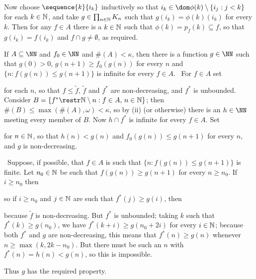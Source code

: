 {Now choose $\sequence{k}{i_k}$ inductively so that
$i_k\in\dom\phi(k)\setminus\{i_j:j<k\}$ for each $k\in\Bbb N$, and take
$g\in\prod_{n\in\Bbb N}K_n$ such that $g(i_k)=\phi(k)(i_k)$ for every
$k$.   Then for any $f\in A$ there is a $k\in\Bbb N$ such that
$\phi(k)=p_f(k)\subseteq f$, so that $g(i_k)=f(i_k)$ and
$f\cap g\ne\emptyset$, as required.\ \Qed

\medskip

 If $A\subseteq\NN$ and $f_0\in\NN$ and $\#(A)<\kappa$,
then there is a function $g\in\NN$ such that $g(0)>0$,             		
$g(n+1)\ge f_0(g(n))$ for every $n$ and
$\{n:f(g(n))\le g(n+1)\}$ is infinite for every $f\in A$.   \Prf\ For
$f\in A$ set


\noindent for each $n$, so that $f\le\tilde f$, $\tilde f$ and $f^*$ are
non-decreasing, and $f^*$ is unbounded.   Consider
$B=\{f^*\restr\Bbb N\setminus n:f\in A,\,n\in\Bbb N\}$;  then
$\#(B)\le\max(\#(A),\omega)<\kappa$,
so by (ii) (or otherwise) there is
an $h\in\NN$ meeting every member of $B$.   Now $h\cap f^*$ is infinite
for every $f\in A$.   Set


\noindent for $n\in\Bbb N$, so that
$h(n)<g(n)$ and $f_0(g(n))\le g(n+1)$ for every
$n$, and $g$ is non-decreasing.

\Quer\ Suppose, if possible, that $f\in A$ is such that
$\{n:f(g(n))\le g(n+1)\}$ is finite.
Let $n_0\in\Bbb N$ be such that $f(g(n))\ge g(n+1)$ for every $n\ge n_0$.
If $i\ge n_0$ then


\noindent so if $i\ge n_0$ and $j\in\Bbb N$ are such that $f^*(j)\ge g(i)$,
then


\noindent because $\tilde f$ is non-decreasing.   But $f^*$ is unbounded;
taking $k$ such that $f^*(k)\ge g(n_0)$, we have $f^*(k+i)\ge g(n_0+2i)$
for every $i\in\Bbb N$;  because both $f^*$ and $g$ are
non-decreasing, this means that $f^*(n)\ge g(n)$ whenever
$n\ge\max(k,2k-n_0)$.   But there must be such an $n$ with
$f^*(n)=h(n)<g(n)$, so this is impossible.\ \Bang

Thus $g$ has the required property.\ \Qed

}
